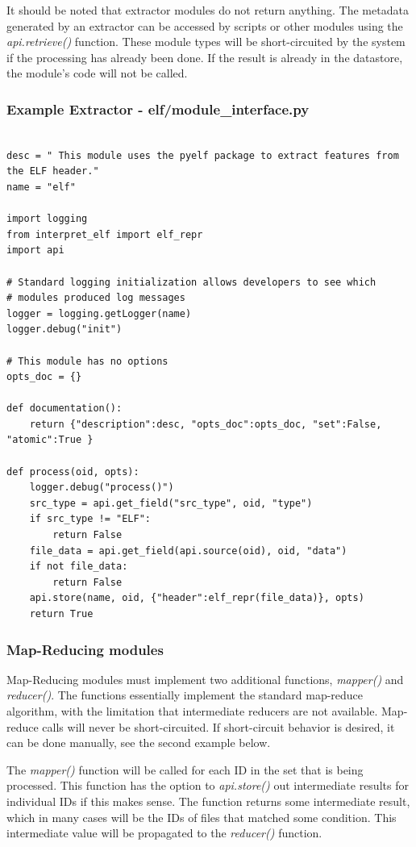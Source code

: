 \documentclass{book}
\begin{document}
It should be noted that extractor modules do not return anything.  The metadata generated by an extractor can be accessed by scripts or other modules using the \emph{api.retrieve()} function.  These module types will be short-circuited by the system if the processing has already been done.  If the result is already in the datastore, the module's code will not be called.

\subsubsection{Example Extractor - elf/module\_interface.py}
\begin{verbatim}

desc = " This module uses the pyelf package to extract features from the ELF header."
name = "elf"

import logging
from interpret_elf import elf_repr
import api

# Standard logging initialization allows developers to see which
# modules produced log messages
logger = logging.getLogger(name)
logger.debug("init")

# This module has no options
opts_doc = {}

def documentation():
    return {"description":desc, "opts_doc":opts_doc, "set":False, "atomic":True }

def process(oid, opts):
    logger.debug("process()")
    src_type = api.get_field("src_type", oid, "type")
    if src_type != "ELF":
        return False
    file_data = api.get_field(api.source(oid), oid, "data")
    if not file_data:
        return False
    api.store(name, oid, {"header":elf_repr(file_data)}, opts)
    return True
\end{verbatim}

\subsubsection{Map-Reducing modules}
Map-Reducing modules must implement two additional functions, \emph{mapper()} and \emph{reducer()}.  The functions essentially implement the standard map-reduce algorithm, with the limitation that intermediate reducers are not available.  Map-reduce calls will never be short-circuited.  If short-circuit behavior is desired, it can be done manually, see the second example below.

The \emph{mapper()} function will be called for each ID in the set that is being processed.  This function has the option to \emph{api.store()} out intermediate results for individual IDs if this makes sense.  The function returns some intermediate result, which in many cases will be the IDs of files that matched some condition.  This intermediate value will be propagated to the \emph{reducer()} function.
\end{document}
